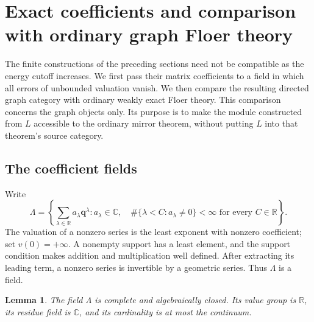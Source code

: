 \documentclass[11pt]{article}
\newtheorem{lemma}[theorem]{Lemma}
\theoremstyle{definition}
\theoremstyle{remark}
\newcommand{\R}{\mathbb R}
\newcommand{\C}{\mathbb C}
\newcommand{\qnov}{\mathbf q}
\numberwithin{equation}{section}
\begin{document}
\section{Exact coefficients and comparison with ordinary graph Floer theory}
\label{cat:section}

The finite constructions of the preceding sections need not be compatible
as the energy cutoff increases.  We first pass their matrix coefficients
to a field in which all errors of unbounded valuation vanish.  We then
compare the resulting directed graph category with ordinary weakly exact
Floer theory.  This comparison concerns the graph objects only.  Its
purpose is to make the module constructed from \(L\) accessible to the
ordinary mirror theorem, without putting \(L\) into that theorem's
source category.

\subsection{The coefficient fields}

Write
\[
 \Lambda=
 \left\{\sum_{\lambda\in\R}a_\lambda\qnov^\lambda:
 a_\lambda\in\C,\quad
 \#\{\lambda<C:a_\lambda\ne0\}<\infty
 \text{ for every }C\in\R\right\}.
\]
The valuation of a nonzero series is the least exponent with nonzero
coefficient; set \(v(0)=+\infty\).  A nonempty support has a least element,
and the support condition makes addition and multiplication well defined.
After extracting its leading term, a nonzero series is invertible by a
geometric series.  Thus \(\Lambda\) is a field.

\begin{lemma}\label{cat:novikov}
The field \(\Lambda\) is complete and algebraically closed.  Its value group
is \(\R\), its residue field is \(\C\), and its cardinality is at most the
continuum.
\end{lemma}
\end{document}
